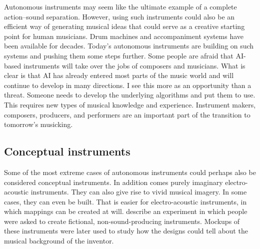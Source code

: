 Autonomous instruments may seem like the ultimate example of a complete action--sound separation. However, using such instruments could also be an efficient way of generating musical ideas that could serve as a creative starting point for human musicians. Drum machines and accompaniment systems have been available for decades. Today's autonomous instruments are building on such systems and pushing them some steps further. Some people are afraid that AI-based instruments will take over the jobs of composers and musicians. What is clear is that AI has already entered most parts of the music world and will continue to develop in many directions. I see this more as an opportunity than a threat. Someone needs to develop the underlying algorithms and put them to use. This requires new types of musical knowledge and experience. Instrument makers, composers, producers, and performers are an important part of the transition to tomorrow's musicking.


\subsection{Conceptual instruments}

Some of the most extreme cases of autonomous instruments could perhaps also be considered conceptual instruments. In addition comes purely imaginary electro-acoustic instruments. They can also give rise to vivid musical imagery. In some cases, they can even be built. That is easier for electro-acoustic instruments, in which mappings can be created at will. \citet{lepri_fictional_2019} describe an experiment in which people were asked to create fictional, non-sound-producing instruments. Mockups of these instruments were later used to study how the designs could tell about the musical background of the inventor.

